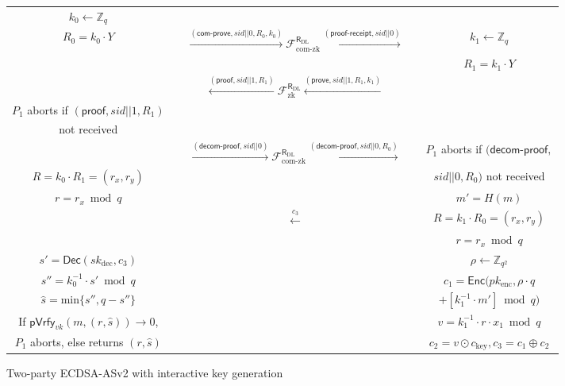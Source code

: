\documentclass{llncs}
\begin{document}
\begin{figure*}[!h]
\begin{center}
{\begin{tabular}{ccccc}
\hline
$k_0\leftarrow \mathbb{Z}_q$ & & &  & \\

$R_0=k_0\cdot Y$& &$\xrightarrow{(\mathsf{com\text{-}prove},sid||0,R_0,k_0)}\mathcal{F}^{\mathsf{R}_{\text{DL}}}_{\text{com-zk}}\xrightarrow{(\mathsf{proof\text{-}receipt},sid||0)}$&  & $k_1\leftarrow \mathbb{Z}_q$\\

 & & &  & $R_1=k_1\cdot Y$\\

 & &$\xleftarrow{(\mathsf{proof},sid||1,R_1)}\mathcal{F}^{\mathsf{R}_{\text{DL}}}_{\text{zk}}\xleftarrow{(\mathsf{prove},sid||1,R_1,k_1)}$ &  & \\

$P_1$ aborts if $(\mathsf{proof},sid||1,R_1)$ & & &  & \\

not received & & &  & \\

& &$\xrightarrow{(\mathsf{decom\text{-}proof},sid||0)}\mathcal{F}^{\mathsf{R}_{\text{DL}}}_{\text{com-zk}}\xrightarrow{(\mathsf{decom\text{-}proof},sid||0,R_0)}$ &  &$P_1$ aborts if $(\mathsf{decom\text{-}proof},$\\

$R=k_0\cdot R_1=(r_x,r_y)$   & & &  &$sid||0,R_0)$ not received \\

$r=r_x\bmod q$ & & &  & $m'=H(m)$\\

& &$\xleftarrow{c_3}$&  & $R=k_1\cdot R_0=(r_x,r_y)$\\

& & &  &$r=r_x \bmod q$  \\
$s'=\mathsf{Dec}(sk_{\text{dec}},c_3)$   & & &  &$\rho\leftarrow \mathbb{Z}_{q^2}$ \\

$s''=k_0^{-1}\cdot s'\bmod q$    & & &  &$c_1=\mathsf{Enc}(pk_{\text{enc}},\rho\cdot q$ \\

 $\hat{s}=$min$\{s'',q-s''\}$ & & &  & $+[k_1^{-1}\cdot m']\bmod q)$\\

 If $\mathsf{pVrfy}_{vk}(m,(r,\hat{s}))\rightarrow 0$,   & & &  &$v=k_1^{-1}\cdot r\cdot x_1\bmod q$ \\

 $P_1$ aborts, else returns $(r,\hat{s})$    & & &  &$c_2=v\odot c_{\text{key}},c_3=c_1\oplus c_2$ \\
\hline
\end{tabular}}
\caption{Two-party ECDSA-ASv2 with interactive key generation}
\label{The two-party ECDSA-based adaptor signature}
\end{center}
\end{figure*}
\end{document}
